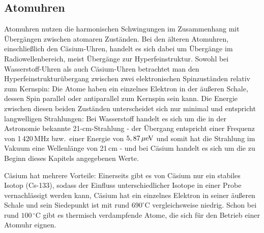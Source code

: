 \subsection{Atomuhren}

Atomuhren 
nutzen die harmonischen Schwingungen im Zusammenhang mit \"Uberg\"angen zwischen
atomaren Zust\"anden. Bei den \"alteren Atomuhren, einschlie\ss lich den C\"asium-Uhren, handelt es sich dabei
um \"Uberg\"ange im Radiowellenbereich, meist \"Uberg\"ange zur Hyperfeinstruktur. Sowohl bei
Wasserstoff-Uhren als auch C\"asium-Uhren betrachtet man den 
Hyperfeinstruktur\"ubergang 
zwischen zwei elektronischen Spinzust\"anden relativ zum Kernspin: Die Atome haben ein einzelnes
Elektron in der \"au\ss eren Schale, dessen Spin parallel oder antiparallel zum Kernspin sein kann. 
Die Energie zwischen diesen beiden Zust\"anden unterscheidet sich nur minimal und entspricht
langwelligen Strahlungen: Bei Wasserstoff handelt es sich um die in der Astronomie bekannte
21-cm-Strahlung - der \"Ubergang entspricht einer Frequenz von 1\,420\,MHz bzw.\ einer Energie
von $5,87\,\mu{\rm eV}$ und somit hat
die Strahlung im Vakuum eine Wellenl\"ange von 21\,cm - und bei C\"asium handelt es sich um die
zu Beginn dieses Kapitels angegebenen Werte. 

C\"asium hat mehrere Vorteile: 
Einerseits gibt es von C\"asium nur ein stabiles Isotop (Cs-133), sodass
der Einfluss unterschiedlicher Isotope in einer Probe vernachl\"assigt werden kann, C\"asium hat ein einzelnes Elektron
in seiner \"au\ss eren Schale und sein Siedepunkt ist mit rund $690^\circ$C vergleichsweise niedrig. Schon bei
rund $100{\,}^\circ$C gibt es thermisch verdampfende Atome, die sich f\"ur den Betrieb einer Atomuhr eignen.

